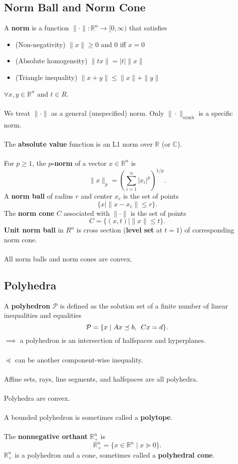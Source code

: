 \documentclass[]{article}
\begin{document}
\subsection*{Norm Ball and Norm Cone}
A \textbf{norm} is a function $ \| \cdot \| : \mathbb{R}^{n}
\rightarrow [0,\infty)$ that satisfies
\begin{itemize}
	\item (Non-negativity) $\| x \| \geq 0$ and $0$ iff $x=0$
	\item (Absolute homogeneity) $\| tx \| = |t|\|x\|$
	\item (Triangle inequality) $\|x+y\| \leq \|x\| + \|y\|$ 
\end{itemize}
$\forall x,y \in \mathbb{R}^{n}$ and $t \in R$. \\\\
We treat $\|\cdot\|$ as a general (unspecified) norm. Only $\|\cdot\|_{\text{symb}}$ is a specific norm. \\\\
The \textbf{absolute value} function is an L1 norm over $\mathbb{R}$ (or $\mathbb{C}$). \\\\
For $p \geq 1 $, the \textbf{$p$-norm} of a vector $x \in \mathbb{R}^n$ is $$\|x\|_{p} = \left(\sum_{i=1}^{n} |x_{i}|^{p}\right)^{1/p}.$$
A \textbf{norm ball} of radius $r$ and center $x_{c}$ is the set of points $$\{x \mid \|x-x_{c}\| \leq r \}.$$
The \textbf{norm cone} $C$ associated with $\|\cdot\|$ is the set of points $$C=\{(x,t) \mid \|x\| \leq t \}.$$
\textbf{Unit norm ball} in $R^{n}$ is cross section (\textbf{level set} at $t=1$) of corresponding norm cone. \\\\ 
All norm balls and norm cones are convex. \\

\subsection*{Polyhedra}
A \textbf{polyhedron} $\mathcal{P}$ is defined as the solution set of a finite number of linear inequalities and equalities $$\mathcal{P} = \{x \mid Ax \preceq b, \enskip Cx = d\}.$$
$\implies$ a polyhedron is an intersection of halfspaces and hyperplanes. \\\\
$\preceq$ can be another component-wise inequality. \\\\
Affine sets, rays, line segments, and halfspaces are all polyhedra. \\\\
Polyhedra are convex. \\\\
A bounded polyhedron is sometimes called a \textbf{polytope}. \\\\
The \textbf{nonnegative orthant} $\mathbb{R}^{n}_{+}$ is $$\mathbb{R}^{n}_{+} = \{x \in \mathbb{R}^{n} \mid x \succeq 0\}.$$
$\mathbb{R}^{n}_{+}$ is a polyhedron and a cone, sometimes called a \textbf{polyhedral cone}. \\
\end{document}
